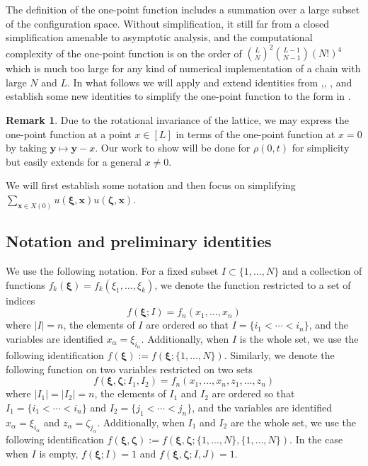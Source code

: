 \documentclass[a4paper,11pt]{article}
\theoremstyle{definition}
\newtheorem{remark}[theorem]{Remark}
\begin{document}
The definition of the one-point function includes a summation over a large subset of the configuration space. Without simplification, it still far from a closed simplification amenable to asymptotic analysis, and the computational complexity of the one-point function is on the order of $\binom{L}{N}^2\binom{L-1}{N-1}\left(N! \right)^4$ which is much too large for any kind of numerical implementation of a chain with large $N$ and $L$. In what follows we will apply and extend identities from \cite{liu_integral_2020},\cite{tracy_asymptotics_2009}, \cite{saenz_domain_2022}, \cite{Cantini:2019zmz} and establish some new identities to simplify the one-point function to the form in .
\begin{remark}
    Due to the rotational invariance of the lattice, we may express the one-point function at a point $x\in [L]$ in terms of the one-point function at $x=0$ by taking $\mathbf{y}\mapsto \mathbf{y}-x$. Our work to show  will be done for $\rho(0,t)$ for simplicity but easily extends for a general $x\neq 0$. 
\end{remark}
We will first establish some notation and then focus on simplifying $\sum_{\mathbf{x} \in X(0)}u(\boldsymbol{\xi}, \mathbf{x})u(\boldsymbol{\zeta}, \mathbf{x})$. 

\subsection{Notation and preliminary identities}

We use the following notation. For a fixed subset $I \subset \{1, \dots, N \}$ and a collection of functions $f_k(\boldsymbol{\xi}) = f_k(\xi_1, \dots, \xi_k)$, we denote the function restricted to a set of indices
\begin{equation}
    f(\boldsymbol{\xi}; I) = f_{n}(x_1, \dots, x_n)
\end{equation}
where $|I|=n$, the elements of $I$ are ordered so that $I = \{i_1 < \cdots < i_n\}$, and the variables are identified $x_{\alpha} = \xi_{i_{\alpha}}$. Additionally, when $I$ is the whole set, we use the following identification $f(\boldsymbol{\xi}) := f(\boldsymbol{\xi}; \{1, \dots, N\})$. Similarly, we denote the following function on two variables restricted on two sets
\begin{equation}
    f(\boldsymbol{\xi}, \boldsymbol{\zeta}; I_1, I_2) = f_n(x_1, \dots, x_n , z_1,\dots, z_n)
\end{equation}
where $|I_1|= |I_2|=n$, the elements of $I_1$ and $I_2$ are ordered so that $I_1 = \{i_1 < \cdots < i_n\}$ and $I_2 = \{j_1 < \cdots < j_n\}$, and the variables are identified $x_{\alpha} = \xi_{i_{\alpha}}$ and $z_{\alpha} = \zeta_{j_{\alpha}}$. Additionally, when $I_1$ and $I_2$ are the whole set, we use the following identification $f(\boldsymbol{\xi}, \boldsymbol{\zeta}) := f(\boldsymbol{\xi}, \boldsymbol{\zeta}; \{1, \dots, N\}, \{1, \dots, N\})$. In the case when $I$ is empty, $f(\boldsymbol{\xi};I)=1$ and $f(\boldsymbol{\xi},\boldsymbol{\zeta};I,J)=1$. 
\end{document}
